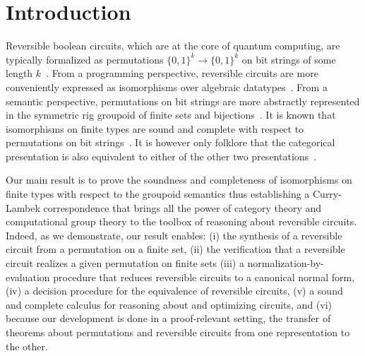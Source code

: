\section{Introduction}
\label{sec:introduction}

Reversible boolean circuits, which are at the core of quantum computing, are
typically formalized as permutations $\{0,1\}^k \to \{0,1\}^k$ on bit strings of
some length $k$~\cite{aaronson_et_al:LIPIcs:2017:8173,1201583}. From a
programming perspective, reversible circuits are more conveniently expressed as
isomorphisms over algebraic
datatypes~\cite{James:2012:IE:2103656.2103667,theseus}. From a semantic
perspective, permutations on bit strings are more abstractly represented in the
symmetric rig groupoid of finite sets and
bijections~\cite{laplaza72,kelly74,baez2000finite}. It is known that
isomorphisms on finite types are sound and complete with respect to permutations
on bit strings~\cite{fiore-remarks}. It is however only folklore that the
categorical presentation is also equivalent to either of the other two
presentations~\cite{baez2000finite,math/9802029}.

Our main result is to prove the soundness and completeness of isomorphisms on
finite types with respect to the groupoid semantics thus establishing a
Curry-Lambek correspondence that brings all the power of category theory and
computational group theory to the toolbox of reasoning about reversible
circuits. Indeed, as we demonstrate, our result enables: (i) the synthesis of a
reversible circuit from a permutation on a finite set, (ii) the verification
that a reversible circuit realizes a given permutation on finite sets (iii) a
normalization-by-evaluation procedure that reduces reversible circuits to a
canonical normal form, (iv) a decision procedure for the equivalence of
reversible circuits, (v) a sound and complete calculus for reasoning about and
optimizing circuits, and (vi) because our development is done in a
proof-relevant setting, the transfer of theorems about permutations and
reversible circuits from one representation to the other.


